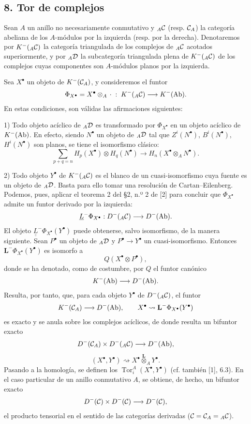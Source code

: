 \subsection*{8. Tor de complejos}

Sean $A$ un anillo no necesariamente conmutativo y ${}_A\mathcal C$ (resp. $\mathcal C_A$) la categoría abeliana de los $A$-módulos por la izquierda (resp. por la derecha). Denotaremos por $K^-({}_A\mathcal C)$ la categoría triangulada de los complejos de ${}_A\mathcal C$ acotados superiormente, y por ${}_A\mathcal D$ la subcategoría triangulada plena de $K^-({}_A\mathcal C)$ de los complejos cuyas componentes son $A$-módulos planos por la izquierda.

Sea $X^\bullet$ un objeto de $K^-(\mathcal C_A)$, y consideremos el funtor
\[
\Phi_{X^\bullet}=X^\bullet\otimes_A\,\cdot\;:\;K^-({}_A\mathcal C)\longrightarrow K^-(\operatorname{Ab}).
\]
En estas condiciones, son válidas las afirmaciones siguientes:

1) Todo objeto acíclico de ${}_A\mathcal D$ es transformado por $\Phi_{X^\bullet}$ en un objeto acíclico de $K^-(\operatorname{Ab})$. En efecto, siendo $N^\bullet$ un objeto de ${}_A\mathcal D$ tal que $Z^i(N^\bullet)$, $B^i(N^\bullet)$, $H^i(N^\bullet)$ son planos, se tiene el isomorfismo clásico:
\[
\sum_{p+q=n}H_p(X^\bullet)\otimes H_q(N^\bullet)
\longrightarrow H_n(X^\bullet\otimes_A N^\bullet).
\]

2) Todo objeto $Y^\bullet$ de $K^-({}_A\mathcal C)$ es el blanco de un cuasi-isomorfismo cuya fuente es un objeto de ${}_A\mathcal D$. Basta para ello tomar una resolución de Cartan--Eilenberg. Podemos, pues, aplicar el teorema 2 del §2, n.º 2 de [2] para concluir que $\Phi_{X^\bullet}$ admite un funtor derivado por la izquierda:
\[
\underline{L}^{-}\Phi_{X^\bullet}:D^-({}_A\mathcal C)\longrightarrow D^-(\operatorname{Ab}).
\]
El objeto $\underline{\underline{L}}^{-}\Phi_{X^\bullet}(Y^\bullet)$ puede obtenerse, salvo isomorfismo, de la manera siguiente. Sean $P^\bullet$ un objeto de ${}_A\mathcal D$ y $P^\bullet\to Y^\bullet$ un cuasi-isomorfismo. Entonces $\mathbf L^{-}\Phi_{X^\bullet}(Y^\bullet)$ es isomorfo a
\[
Q(X^\bullet\otimes P^\bullet),
\]
donde se ha denotado, como de costumbre, por $Q$ el funtor canónico
\[
K^-(\operatorname{Ab})\longrightarrow D^-(\operatorname{Ab}).
\]
Resulta, por tanto, que, para cada objeto $Y^\bullet$ de $D^-({}_A\mathcal C)$, el funtor
\[
K^-(\mathcal C_A)\longrightarrow D^-(\operatorname{Ab}),\qquad
X^\bullet\rightsquigarrow \mathbf L^{-}\Phi_{X^\bullet}(Y^\bullet)
\]
es exacto y se anula sobre los complejos acíclicos, de donde resulta un bifuntor exacto
\[
D^-(\mathcal C_A)\times D^-({}_A\mathcal C)\longrightarrow D^-(\operatorname{Ab}),
\]
\[
(X^\bullet,Y^\bullet)\rightsquigarrow X^\bullet\overset{\mathbf L}{\otimes}_A Y^\bullet.
\]
Pasando a la homología, se definen los $\operatorname{Tor}_i^A(X^\bullet,Y^\bullet)$ (cf. también [1], 6.3). En el caso particular de un anillo conmutativo $A$, se obtiene, de hecho, un bifuntor exacto
\[
D^-(\mathcal C)\times D^-(\mathcal C)\longrightarrow D^-(\mathcal C),
\]
el producto tensorial en el sentido de las categorías derivadas ($\mathcal C=\mathcal C_A={}_A\mathcal C$).
